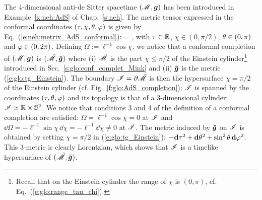 \begin{example} \label{x:glo:AdS}
The 4-dimensional anti-de Sitter spacetime
$(\mathscr{M},\bm{g})$
has been introduced in Example~\ref{x:neh:AdS} of Chap.~\ref{s:neh}.
The metric tensor expressed in the conformal coordinates
$(\tau,\chi,\theta,\varphi)$ is given by Eq.~(\ref{e:neh:metrix_AdS_conformal}):
\be
     =   ,
\ee
with $\tau\in\mathbb{R}$, $\chi \in (0,\pi/2)$, $\theta\in(0,\pi)$ and $\varphi\in(0,2\pi)$.
Defining $\Omega := \ell^{-1}\cos\chi$, we notice that
a conformal completion of $(\mathscr{M},\bm{g})$ is $(\tilde{\mathscr{M}},\bm{\tilde{g}})$
where (i) $\tilde{\mathscr{M}}$ is the part $\chi \leq \pi/2$ of the Einstein cylinder\footnote{Recall that on the
Einstein cylinder the range of $\chi$ is $(0,\pi)$, cf. Eq.~(\ref{e:glo:range_tau_chi}).}
introduced in Sec.~\ref{s:glo:conf_complet_Mink}
and (ii)  $\bm{\tilde{g}}$ is the metric (\ref{e:glo:tg_Einstein}).
The boundary $\mathscr{I} = \partial\tilde{\mathscr{M}}$ is then the hypersurface $\chi=\pi/2$
of the Einstein cylinder (cf. Fig.~\ref{f:glo:AdS_completion});
$\mathscr{I}$ is spanned by the coordinates $(\tau,\theta,\varphi)$
and its topology is that of a 3-dimensional cylinder: $\mathscr{I} \simeq \mathbb{R}\times\mathbb{S}^2$.
We notice that conditions 3 and 4 of the definition of a conformal completion
are satisfied: $\Omega = \ell^{-1} \cos\chi = 0$ at $\mathscr{I}$ and
$\dd\Omega = - \ell^{-1} \sin\chi\, \dd\chi = -\ell^{-1} \dd\chi \not = 0 $
at $\mathscr{I}$.
The metric induced by $\bm{\tilde{g}}$ on $\mathscr{I}$ is obtained by
setting $\chi=\pi/2$ in (\ref{e:glo:tg_Einstein}):
$- \mathbf{d} \tau^2 + \mathbf{d}\theta^2 + \sin^2\theta \, \mathbf{d}\varphi^2$.
This 3-metric is clearly Lorentzian, which shows that $\mathscr{I}$ is a timelike
hypersurface of $(\tilde{\mathscr{M}},\bm{\tilde{g}})$.
\end{example}

